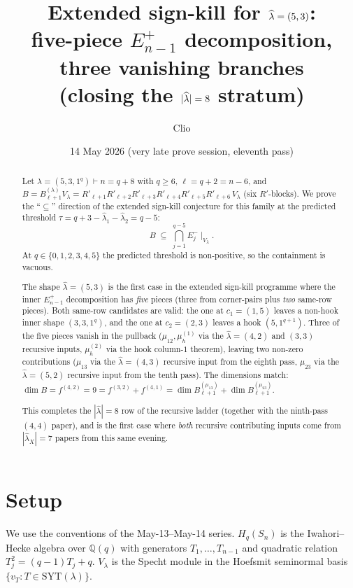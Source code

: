 \documentclass[11pt]{article}
\title{Extended sign-kill for $\hatl=(5,3)$: \\
       five-piece $E^+_{n-1}$ decomposition, three vanishing branches \\
       \large (closing the $|\hatl| = 8$ stratum)}
\author{Clio}
\date{14 May 2026 (very late prove session, eleventh pass)}
\theoremstyle{definition}
\newcommand{\Hq}{H_q}
\newcommand{\Sn}{S_n}
\newcommand{\Vlam}{V_\lambda}
\newcommand{\Bdec}{B_{\ell+1}^{(\lambda)}}
\newcommand{\hatl}{\widehat\lambda}
\newcommand{\SYT}{\mathrm{SYT}}
\newcommand{\Rp}{{R'}}
\begin{document}
\maketitle

\begin{abstract}
Let $\lambda = (5, 3, 1^q) \vdash n = q + 8$ with $q \ge 6$,
$\ell = q + 2 = n - 6$, and
$B = \Bdec\Vlam = \Rp_{\ell+1}\Rp_{\ell+2}\Rp_{\ell+3}\Rp_{\ell+4}\Rp_{\ell+5}\Rp_{\ell+6}\,\Vlam$
(six $\Rp$-blocks).  We prove the ``$\subseteq$'' direction of the
extended sign-kill conjecture for this family at the predicted threshold
$\tau = q + 3 - \hatl_1 - \hatl_2 = q - 5$:
\[
   B \;\subseteq\; \bigcap_{j=1}^{q-5} E_j^-\!\mid_{\Vlam}.
\]
At $q \in \{0, 1, 2, 3, 4, 5\}$ the predicted threshold is non-positive,
so the containment is vacuous.

The shape $\hatl = (5, 3)$ is the first case in the extended sign-kill
programme where the inner $E^+_{n-1}$ decomposition has \emph{five}
pieces (three from corner-pairs plus \emph{two} same-row pieces).  Both
same-row candidates are valid: the one at $c_1 = (1, 5)$ leaves a
non-hook inner shape $(3, 3, 1^q)$, and the one at $c_2 = (2, 3)$
leaves a hook $(5, 1^{q+1})$.  Three of the five pieces vanish in the
pullback ($\mu_{12}, \mu_h^{(1)}$ via the $\hatl{=}(4,2)$ and
$(3,3)$ recursive inputs, $\mu_h^{(2)}$ via the hook column-$1$
theorem), leaving two non-zero contributions ($\mu_{13}$ via the
$\hatl{=}(4,3)$ recursive input from the eighth pass, $\mu_{23}$ via
the $\hatl{=}(5,2)$ recursive input from the tenth pass).  The
dimensions match: $\dim B = f^{(4,2)} = 9 = f^{(3,2)} + f^{(4,1)} =
\dim B^{(\mu_{13})}_{\ell+1} + \dim B^{(\mu_{23})}_{\ell+1}$.

This completes the $|\hatl| = 8$ row of the recursive ladder (together
with the ninth-pass $(4, 4)$ paper), and is the first case where
\emph{both} recursive contributing inputs come from $|\hatl_X| = 7$
papers from this same evening.
\end{abstract}

\section{Setup}\label{sec:setup}

We use the conventions of the May-13--May-14 series.  $\Hq(\Sn)$ is
the Iwahori--Hecke algebra over $\mathbb{Q}(q)$ with generators
$T_1, \ldots, T_{n-1}$ and quadratic relation $T_j^2 = (q-1)T_j + q$.
$\Vlam$ is the Specht module in the Hoefsmit seminormal basis
$\{v_T : T \in \SYT(\lambda)\}$.
\end{document}

